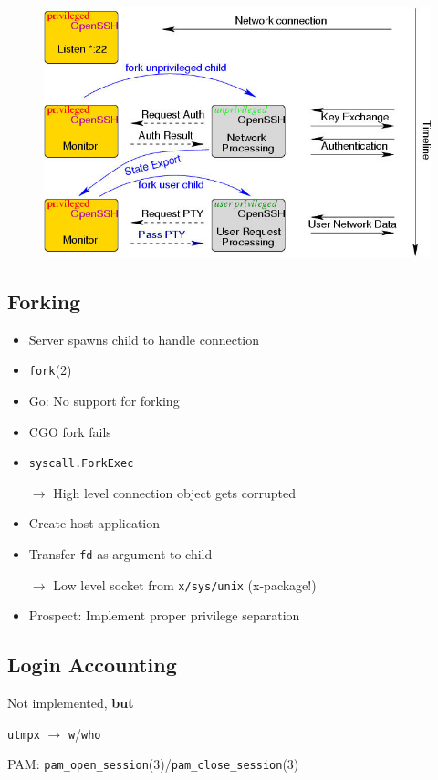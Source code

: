 \documentclass[
	xcolor=dvipsnames,
	handout
]{beamer}
\newenvironment{zhawframe}[1][]
{\begin{frame}[environment=fr,#1]{\insertsubsectionhead}{\insertsectionhead}}
{\end{frame}
}
\begin{document}
\begin{zhawframe}
\begin{figure}[ht]
\includegraphics[width=\textwidth]{priv}
\end{figure}
\end{zhawframe}

\subsection{Forking}
\begin{zhawframe}
\begin{itemize}
\item<1-> Server spawns child to handle connection
\item<2-> \texttt{fork}(2)
\item<3-> Go: No support for forking
\item<4-> CGO fork fails
\item<5-> \texttt{syscall.ForkExec}

$\rightarrow$ High level connection object gets corrupted
\item<7-> Create host application
\item<8-> Transfer \texttt{fd} as argument to child

$\rightarrow$ Low level socket from \texttt{x/sys/unix} (x-package!)
\item<10-> Prospect: Implement proper privilege separation
\end{itemize}
\end{zhawframe}

\subsection{Login Accounting}
\begin{zhawframe}
 Not implemented, \textbf{but}

 \texttt{utmpx} $\rightarrow$ \texttt{w}/\texttt{who}

 PAM: \texttt{pam\_{}open\_{}session}(3)/\texttt{pam\_{}close\_{}session}(3)
\end{zhawframe}
\end{document}
